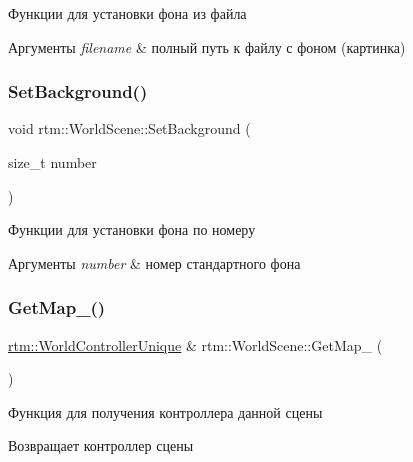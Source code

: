 Функции для установки фона из файла 
\begin{DoxyParams}{Аргументы}
{\em filename} & полный путь к файлу с фоном (картинка) \\
\hline
\end{DoxyParams}
\mbox{\label{classrtm_1_1_world_scene_a097fa828c003f8757faf1aebdd0e63f1}} 
\subsubsection{\texorpdfstring{Set\+Background()}{SetBackground()}\hspace{0.1cm}{\footnotesize\ttfamily [2/2]}}
{\footnotesize\ttfamily void rtm\+::\+World\+Scene\+::\+Set\+Background (\begin{DoxyParamCaption}\item[{size\+\_\+t}]{number }\end{DoxyParamCaption})}

Функции для установки фона по номеру 
\begin{DoxyParams}{Аргументы}
{\em number} & номер стандартного фона \\
\hline
\end{DoxyParams}
\mbox{\label{classrtm_1_1_world_scene_a8995a69857907834953be1bb2ccb2845}} 
\subsubsection{\texorpdfstring{Get\+Map\+\_\+()}{GetMap\_()}}
{\footnotesize\ttfamily \hyperlink{namespacertm_a3081db54851f6008db32c1ee28d14ecf}{rtm\+::\+World\+Controller\+Unique} \& rtm\+::\+World\+Scene\+::\+Get\+Map\+\_\+ (\begin{DoxyParamCaption}{ }\end{DoxyParamCaption})\hspace{0.3cm}{\ttfamily [private]}}

Функция для получения контроллера данной сцены \begin{DoxyReturn}{Возвращает}
контроллер сцены 
\end{DoxyReturn}
\mbox{\label{classrtm_1_1_world_scene_a9e5a1d8ae0ce64055460755564e48d78}} 
